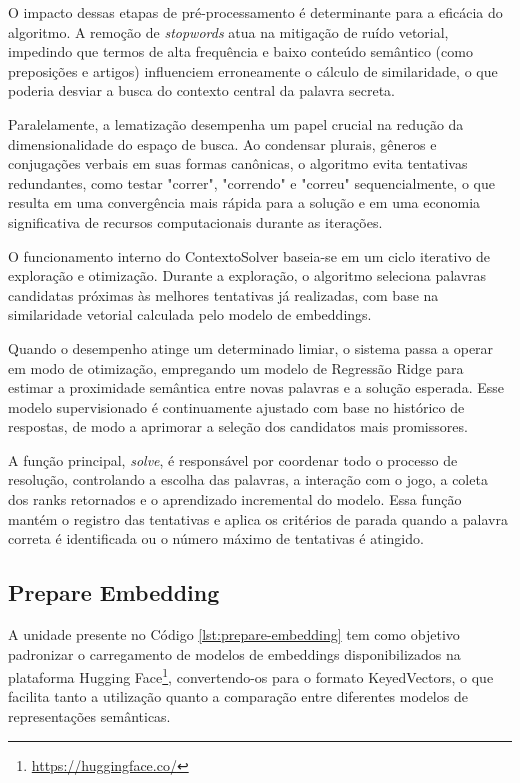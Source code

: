 O impacto dessas etapas de pré-processamento é determinante para a eficácia do algoritmo. A remoção de \textit{stopwords} atua na mitigação de ruído vetorial, impedindo que termos de alta frequência e baixo conteúdo semântico (como preposições e artigos) influenciem erroneamente o cálculo de similaridade, o que poderia desviar a busca do contexto central da palavra secreta.

Paralelamente, a lematização desempenha um papel crucial na redução da dimensionalidade do espaço de busca. Ao condensar plurais, gêneros e conjugações verbais em suas formas canônicas, o algoritmo evita tentativas redundantes, como testar "correr", "correndo" e "correu" sequencialmente, o que resulta em uma convergência mais rápida para a solução e em uma economia significativa de recursos computacionais durante as iterações.

O funcionamento interno do ContextoSolver baseia-se em um ciclo iterativo de exploração e otimização. Durante a exploração, o algoritmo seleciona palavras candidatas próximas às melhores tentativas já realizadas, com base na similaridade vetorial calculada pelo modelo de embeddings.

Quando o desempenho atinge um determinado limiar, o sistema passa a operar em modo de otimização, empregando um modelo de Regressão Ridge para estimar a proximidade semântica entre novas palavras e a solução esperada. Esse modelo supervisionado é continuamente ajustado com base no histórico de respostas, de modo a aprimorar a seleção dos candidatos mais promissores.

A função principal, \textit{solve}, é responsável por coordenar todo o processo de resolução, controlando a escolha das palavras, a interação com o jogo, a coleta dos ranks retornados e o aprendizado incremental do modelo. Essa função mantém o registro das tentativas e aplica os critérios de parada quando a palavra correta é identificada ou o número máximo de tentativas é atingido.

\subsection{Prepare Embedding}
A unidade presente no Código \ref{lst:prepare-embedding} tem como objetivo padronizar o carregamento de modelos de embeddings disponibilizados na plataforma Hugging Face\footnote{\url{https://huggingface.co/}}, convertendo-os para o formato KeyedVectors, o que facilita tanto a utilização quanto a comparação entre diferentes modelos de representações semânticas.

